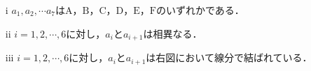 \documentclass[unicode,12pt, A4j]{ltjsarticle}%
\begin{document}
\begin{itemize}
 \item[i] $a_1,a_2,\cdots a_7$は$\mathrm{A}$，$\mathrm{B}$，$\mathrm{C}$，$\mathrm{D}$，$\mathrm{E}$，$\mathrm{F}$のいずれかである．
 \item[ii] $i=1,2,\cdots,6$に対し，$a_i$と$a_{i+1}$は相異なる．
 \item[iii] $i=1,2,\cdots,6$に対し，$a_i$と$a_{i+1}$は右図において線分で結ばれている．
\end{itemize}

\begin{figure}[htb]
 \centering
 
\end{figure}
\end{document}

